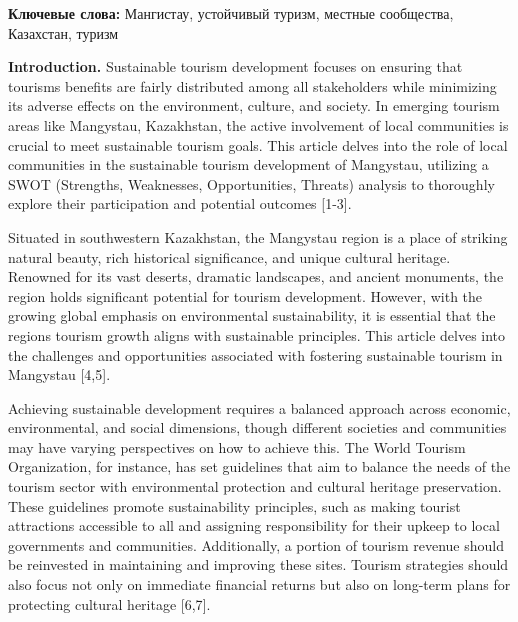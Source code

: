 {\bfseries Ключевые слова:} Мангистау, устойчивый туризм, местные
сообщества, Казахстан, туризм

\begin{multicols}{2}
{\bfseries Introduction.} Sustainable tourism development focuses on
ensuring that tourism\textquotesingle s benefits are fairly distributed
among all stakeholders while minimizing its adverse effects on the
environment, culture, and society. In emerging tourism areas like
Mangystau, Kazakhstan, the active involvement of local communities is
crucial to meet sustainable tourism goals. This article delves into the
role of local communities in the sustainable tourism development of
Mangystau, utilizing a SWOT (Strengths, Weaknesses, Opportunities,
Threats) analysis to thoroughly explore their participation and
potential outcomes {[}1-3{]}.

Situated in southwestern Kazakhstan, the Mangystau region is a place of
striking natural beauty, rich historical significance, and unique
cultural heritage. Renowned for its vast deserts, dramatic landscapes,
and ancient monuments, the region holds significant potential for
tourism development. However, with the growing global emphasis on
environmental sustainability, it is essential that the
region\textquotesingle s tourism growth aligns with sustainable
principles. This article delves into the challenges and opportunities
associated with fostering sustainable tourism in Mangystau {[}4,5{]}.

Achieving sustainable development requires a balanced approach across
economic, environmental, and social dimensions, though different
societies and communities may have varying perspectives on how to
achieve this. The World Tourism Organization, for instance, has set
guidelines that aim to balance the needs of the tourism sector with
environmental protection and cultural heritage preservation. These
guidelines promote sustainability principles, such as making tourist
attractions accessible to all and assigning responsibility for their
upkeep to local governments and communities. Additionally, a portion of
tourism revenue should be reinvested in maintaining and improving these
sites. Tourism strategies should also focus not only on immediate
financial returns but also on long-term plans for protecting cultural
heritage {[}6,7{]}.


\end{multicols}
